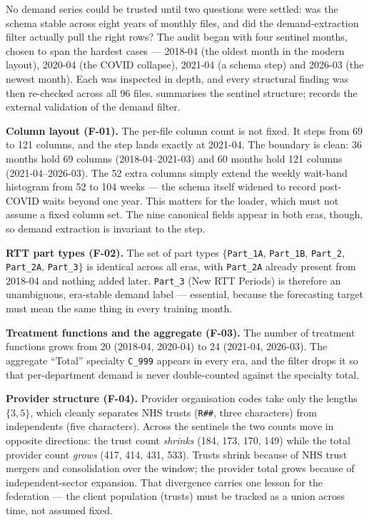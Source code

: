 \documentclass[11pt,a4paper]{article}
\begin{document}
No demand series could be trusted until two questions were settled: was the schema stable across eight years of monthly files, and did the demand-extraction filter actually pull the right rows? The audit began with four sentinel months, chosen to span the hardest cases --- 2018-04 (the oldest month in the modern layout), 2020-04 (the COVID collapse), 2021-04 (a schema step) and 2026-03 (the newest month). Each was inspected in depth, and every structural finding was then re-checked across all 96 files.  summarises the sentinel structure;  records the external validation of the demand filter.

\textbf{Column layout (F-01).} The per-file column count is not fixed. It steps from 69 to 121 columns, and the step lands exactly at 2021-04. The boundary is clean: 36 months hold 69 columns (2018-04--2021-03) and 60 months hold 121 columns (2021-04--2026-03). The 52 extra columns simply extend the weekly wait-band histogram from 52 to 104 weeks --- the schema itself widened to record post-COVID waits beyond one year. This matters for the loader, which must not assume a fixed column set. The nine canonical fields appear in both eras, though, so demand extraction is invariant to the step.

\textbf{RTT part types (F-02).} The set of part types $\{$\texttt{Part\_1A}, \texttt{Part\_1B}, \texttt{Part\_2}, \texttt{Part\_2A}, \texttt{Part\_3}$\}$ is identical across all eras, with \texttt{Part\_2A} already present from 2018-04 and nothing added later. \texttt{Part\_3} (New RTT Periods) is therefore an unambiguous, era-stable demand label --- essential, because the forecasting target must mean the same thing in every training month.

\textbf{Treatment functions and the aggregate (F-03).} The number of treatment functions grows from 20 (2018-04, 2020-04) to 24 (2021-04, 2026-03). The aggregate ``Total'' specialty \texttt{C\_999} appears in every era, and the filter drops it so that per-department demand is never double-counted against the specialty total.

\textbf{Provider structure (F-04).} Provider organisation codes take only the lengths $\{3,5\}$, which cleanly separates NHS trusts (\texttt{R\#\#}, three characters) from independents (five characters). Across the sentinels the two counts move in opposite directions: the trust count \emph{shrinks} (184, 173, 170, 149) while the total provider count \emph{grows} (417, 414, 431, 533). Trusts shrink because of NHS trust mergers and consolidation over the window; the provider total grows because of independent-sector expansion. That divergence carries one lesson for the federation --- the client population (trusts) must be tracked as a union across time, not assumed fixed.
\end{document}
